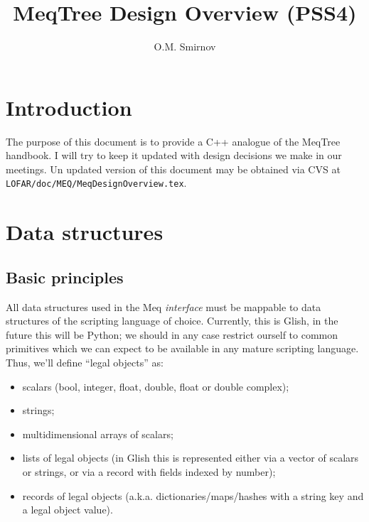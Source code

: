 \documentclass[10pt]{article}
\title{MeqTree Design Overview (PSS4)}
\author{O.M. Smirnov}
\begin{document}
\sloppy

\newcommand{\url}[1]{{\tt #1}}

\maketitle

\newcommand{\qq}[1]{{\tt #1}}

\newcommand{\Request}{{\tt Request}}
\newcommand{\RequestId}{{\tt RequestId}}
\newcommand{\Result}{{\tt Result}}
\newcommand{\VellSet}{{\tt VellSet}}
\newcommand{\Cells}{{\tt Cells}}
\newcommand{\Vells}{{\tt Vells}}
\newcommand{\Domain}{{\tt Domain}}
\newcommand{\Node}{{\tt Node}}
\newcommand{\Parm}{{\tt Parm}}
\newcommand{\Polc}{{\tt Polc}}
\newcommand{\RES}[1]{{\tt RES\_#1}}




\section{Introduction}

The purpose of this document is to provide a C++ analogue of the MeqTree
handbook. I will try to keep it updated with design decisions we make in our
meetings. Un updated version of this document may be obtained via CVS at
\qq{LOFAR/doc/MEQ/MeqDesignOverview.tex}.

\section{Data structures} 

\subsection{Basic principles}

  All data structures used in the Meq {\em interface} must be mappable to data
  structures of the scripting language of choice. Currently, this is Glish, in
  the future this will be Python; we should in any case restrict ourself to
  common primitives which we can expect to be available in any mature scripting
  language. Thus, we'll define ``legal objects'' as:

  \begin{itemize}
  
  \item scalars (bool, integer, float, double, float or double complex);
  
  \item strings;
  
  \item multidimensional arrays of scalars;
  
  \item lists of legal objects (in Glish this is represented either  via a
  vector of scalars or strings, or via a record with fields indexed by number);

  \item records of legal objects (a.k.a. dictionaries/maps/hashes with a string
  key and a legal object value).

  \end{itemize}
\end{document}
